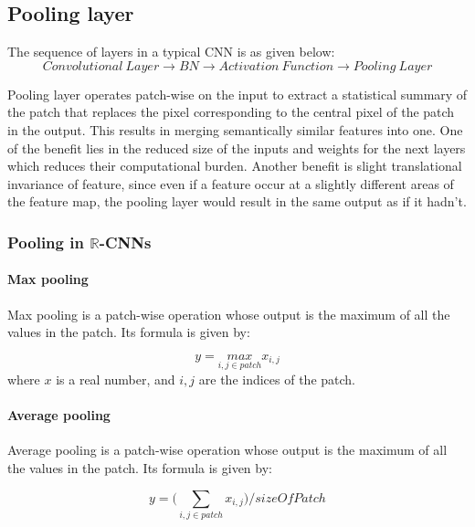  \subsection{Pooling layer}
 The sequence of layers in a typical CNN is as given below: 
 \begin{equation}
 Convolutional \ Layer\longrightarrow BN \longrightarrow Activation \ Function \longrightarrow  Pooling \ Layer
 \end{equation}
 
 Pooling layer operates patch-wise on the input to extract a statistical summary of the patch that replaces the pixel corresponding to the central pixel of the patch in the output. This results in merging semantically similar features into one. One of the benefit lies in the reduced size of the inputs and weights for the next layers which reduces their computational burden. Another benefit is slight translational invariance of feature, since even if a feature occur at a slightly different areas of the feature map, the pooling layer would result in the same output as if it hadn't. 

 \subsubsection{Pooling in $\mathbb{R}$-CNNs}
 \paragraph{Max pooling}
 Max pooling is a patch-wise operation whose output is the maximum of all the values in the patch. Its formula is given by:
 
 \begin{equation}
 y = \underset{i,j \in patch}{max} x_{i,j}
 \end{equation}
 where $x$ is a real number, and $i,j$ are the indices of the patch.
 
 \paragraph{Average pooling}
 Average pooling is a patch-wise operation whose output is the maximum of all the values in the patch. Its formula is given by:

 \begin{equation}
 y = \bigg(\underset{i,j \in patch}{\sum} x_{i,j} \bigg)/ sizeOfPatch
 \end{equation}
 
